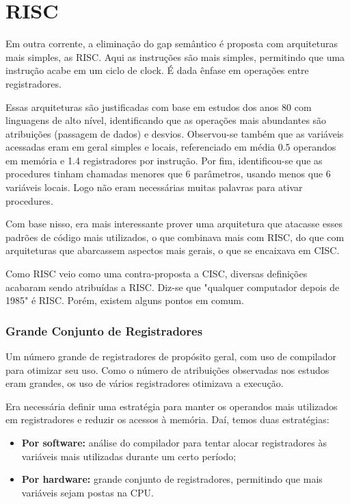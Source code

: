 \section{RISC}
Em outra corrente, a eliminação do gap semântico é proposta com arquiteturas mais simples, as RISC. Aqui as instruções são mais simples, permitindo que uma instrução acabe em um ciclo de clock. É dada ênfase em operações entre registradores.

Essas arquiteturas são justificadas com base em estudos dos anos 80 com linguagens de alto nível, identificando que as operações mais abundantes são atribuições (passagem de dados) e desvios. Observou-se também que as variáveis acessadas eram em geral simples e locais, referenciado em média 0.5 operandos em memória e 1.4 registradores por instrução. Por fim, identificou-se que as procedures tinham chamadas menores que 6 parâmetros, usando menos que 6 variáveis locais. Logo não eram necessárias muitas palavras para ativar procedures.

Com base nisso, era mais interessante prover uma arquitetura que atacasse esses padrões de código mais utilizados, o que combinava mais com RISC, do que com arquiteturas que abarcassem aspectos mais gerais, o que se encaixava em CISC.

Como RISC veio como uma contra-proposta a CISC, diversas definições acabaram sendo atribuídas a RISC. Diz-se que "qualquer computador depois de 1985" é RISC. Porém, existem alguns pontos em comum.

\subsubsection{Grande Conjunto de Registradores}
Um número grande de registradores de propósito geral, com uso de compilador para otimizar seu uso. Como o número de atribuições observadas nos estudos eram grandes, os uso de vários registradores otimizava a execução.

Era necessária definir uma estratégia para manter os operandos mais utilizados em registradores e reduzir os acessos à memória. Daí, temos duas estratégias:
\begin{itemize}
  \item \textbf{Por software:} análise do compilador para tentar alocar registradores às variáveis mais utilizadas durante um certo período;

  \item \textbf{Por hardware:} grande conjunto de registradores, permitindo que mais variáveis sejam postas na CPU.
\end{itemize}

